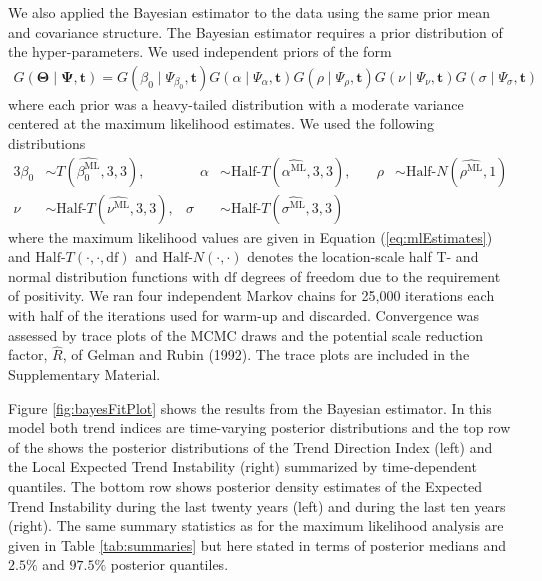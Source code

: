 \documentclass[
  11pt,
]{article}
\theoremstyle{nonumberplain}
\begin{document}
We also applied the Bayesian estimator to the data using the same prior
mean and covariance structure. The Bayesian estimator requires a prior
distribution of the hyper-parameters. We used independent priors of the
form \begin{align*}
G(\bm{\Theta} \mid \bm{\Psi}, \mathbf{t}) = G(\beta_0 \mid \Psi_{\beta_0}, \mathbf{t})G(\alpha \mid \Psi_{\alpha}, \mathbf{t})G(\rho \mid \Psi_{\rho}, \mathbf{t})G(\nu \mid \Psi_{\nu}, \mathbf{t})G(\sigma \mid \Psi_{\sigma}, \mathbf{t})
\end{align*} where each prior was a heavy-tailed distribution with a
moderate variance centered at the maximum likelihood estimates. We used
the following distributions \begin{alignat*}{3}
 \beta_0 &\sim T\left(\widehat{\beta_0^\text{ML}}, 3, 3\right), &\quad \alpha &\sim \text{Half-}T\left(\widehat{\alpha^\text{ML}}, 3, 3\right), &\quad \rho &\sim \text{Half-}N\left(\widehat{\rho^\text{ML}}, 1\right)\\   
 \nu &\sim \text{Half-}T\left(\widehat{\nu^\text{ML}}, 3, 3\right), & \sigma &\sim \text{Half-}T\left(\widehat{\sigma^\text{ML}}, 3, 3\right)  & 
\end{alignat*} where the maximum likelihood values are given in Equation
(\ref{eq:mlEstimates}) and \(\text{Half-}T(\cdot, \cdot, \mathrm{df})\)
and \(\text{Half-}N(\cdot, \cdot)\) denotes the location-scale half T-
and normal distribution functions with \(\mathrm{df}\) degrees of
freedom due to the requirement of positivity. We ran four independent
Markov chains for 25,000 iterations each with half of the iterations
used for warm-up and discarded. Convergence was assessed by trace plots
of the MCMC draws and the potential scale reduction factor,
\(\widehat{R}\), of Gelman and Rubin (1992). The trace plots are
included in the Supplementary Material.

Figure \ref{fig:bayesFitPlot} shows the results from the Bayesian
estimator. In this model both trend indices are time-varying posterior
distributions and the top row of the shows the posterior distributions
of the Trend Direction Index (left) and the Local Expected Trend
Instability (right) summarized by time-dependent quantiles. The bottom
row shows posterior density estimates of the Expected Trend Instability
during the last twenty years (left) and during the last ten years
(right). The same summary statistics as for the maximum likelihood
analysis are given in Table \ref{tab:summaries} but here stated in terms
of posterior medians and \(2.5\%\) and \(97.5\%\) posterior quantiles.
\end{document}
